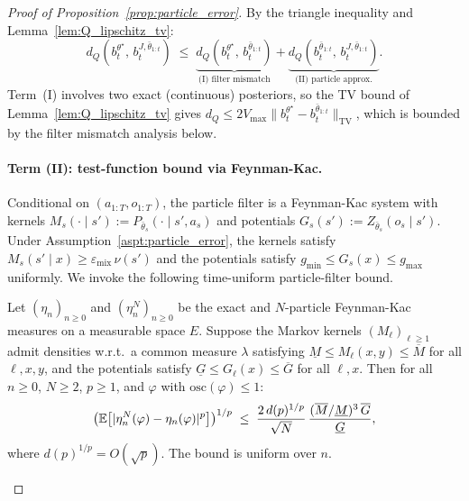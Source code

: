     \begin{proof}[Proof of Proposition~\ref{prop:particle_error}]
    By the triangle inequality and Lemma~\ref{lem:Q_lipschitz_tv}:
    \begin{equation}\label{eq:pf_triangle}  
    d_Q(b_t^{\theta^\star},\,b_t^{J,\bar\theta_{1:t}})
    \;\le\;
    \underbrace{d_Q(b_t^{\theta^\star},\,b_t^{\bar\theta_{1:t}})}_{\text{(I) filter mismatch}}
    +
    \underbrace{d_Q(b_t^{\bar\theta_{1:t}},\,b_t^{J,\bar\theta_{1:t}})}_{\text{(II) particle approx.}}.
    \end{equation}
    Term~(I) involves two exact (continuous) posteriors, so the TV bound of Lemma~\ref{lem:Q_lipschitz_tv} gives $d_Q\le 2V_{\max}\|b_t^{\theta^\star}-b_t^{\bar\theta_{1:t}}\|_{\mathrm{TV}}$, which is bounded by the filter mismatch analysis below.

    \paragraph{Term (II): test-function bound via Feynman-Kac.}
    Conditional on $(a_{1:T},o_{1:T})$, the particle filter is a Feynman-Kac system with kernels $M_s(\cdot\mid s'):=P_{\bar\theta_s}(\cdot\mid s',a_s)$ and potentials $G_s(s'):=Z_{\bar\theta_s}(o_s\mid s')$. Under Assumption~\ref{aspt:particle_error}, the kernels satisfy $M_s(s'\mid x)\ge\varepsilon_{\mathrm{mix}}\,\nu(s')$ and the potentials satisfy $g_{\min}\le G_s(x)\le g_{\max}$ uniformly. We invoke the following time-uniform particle-filter bound. 
    
    \begin{lem}\label{lem:karjalainen}
    Let $(\eta_n)_{n\ge 0}$ and $(\eta_n^N)_{n\ge 0}$ be the exact and $N$-particle Feynman-Kac measures on a measurable space $E$. Suppose the Markov kernels $(M_\ell)_{\ell\ge 1}$ admit densities w.r.t.\ a common measure $\lambda$ satisfying $\underline M\le M_\ell(x,y)\le\overline M$ for all $\ell,x,y$, and the potentials satisfy $\underline G\le G_\ell(x)\le\overline G$ for all $\ell,x$. Then for all $n\ge 0$, $N\ge 2$, $p\ge 1$, and $\varphi$ with $\mathrm{osc}(\varphi)\le 1$:
    \begin{equation}\label{eq:karjalainen_lp}
    \bigl(\mathbb{E}\bigl[|\eta_n^N(\varphi)-\eta_n(\varphi)|^p\bigr]\bigr)^{1/p} 
    \;\le\;
    \frac{2\,d(p)^{1/p}}{\sqrt{N}}\,\frac{(\overline M/\underline M)^3\,\overline G}{\underline G},
    \end{equation}
    where $d(p)^{1/p}=O(\sqrt{p})$. The bound is uniform over $n$.
    \end{lem}


\end{proof}
